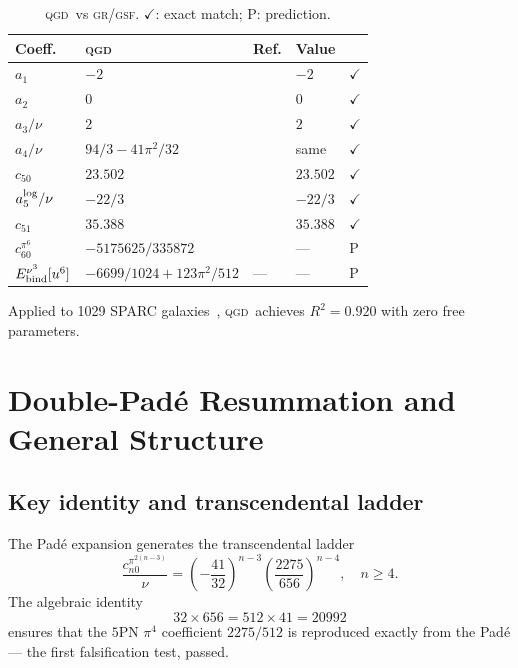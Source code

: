 \documentclass[twocolumn,aps,prd,showpacs,superscriptaddress,floatfix]{revtex4-2}
\newcommand{\pn}[1]{$#1$PN}
\newcommand{\QGD}{\textsc{qgd}}
\newcommand{\GR}{\textsc{gr}}
\newcommand{\GSF}{\textsc{gsf}}
\begin{document}
\begin{table}[ht]
\centering
\caption{\QGD\ vs \GR/\GSF. $\checkmark$: exact match; P: prediction.}
\label{tab:gr}
\begin{tabular}{lllll}
\toprule
Coeff.\ & \QGD & Ref. & Value & \\
\midrule
$a_1$ & $-2$ & \cite{Buonanno:1998gg} & $-2$ & $\checkmark$ \\
$a_2$ & $0$ & \cite{Buonanno:1998gg} & $0$ & $\checkmark$ \\
$a_3/\nu$ & $2$ & \cite{Damour:2001bu} & $2$ & $\checkmark$ \\
$a_4/\nu$ & $94/3-41\pi^2/32$ & \cite{Damour:2001bu} & same & $\checkmark$ \\
$c_{50}$ & $23.502$ & \cite{Bini:2013zaa} & $23.502$ & $\checkmark$ \\
$a_5^{\rm log}/\nu$ & $-22/3$ & \cite{Damour:2014jta} & $-22/3$ & $\checkmark$ \\
$c_{51}$ & $35.388$ & \cite{Bini:2020hmy} & $35.388$ & $\checkmark$ \\
$c_{60}^{\pi^6}$ & $-5175625/335872$ & \cite{Bini:2020wpo} & --- & P \\
$E_{\rm bind}^{\nu^3}[u^6]$ & $-6699/1024+123\pi^2/512$ & --- & --- & P \\
\bottomrule
\end{tabular}
\end{table}

Applied to 1029 SPARC galaxies~\cite{Lelli:2016zqa},
\QGD\ achieves $R^2=0.920$ with zero free parameters.

\section{Double-Pad\'e Resummation and General Structure}
\label{sec:resum}

\subsection{Key identity and transcendental ladder}

The Pad\'e expansion generates the transcendental ladder
\begin{equation}
  \frac{c_{n0}^{\pi^{2(n-3)}}}{\nu}
  = \left(-\frac{41}{32}\right)^{n-3}
    \!\left(\frac{2275}{656}\right)^{n-4},
  \quad n\ge4.
  \label{eq:ladder}
\end{equation}
The algebraic identity
\begin{equation}
  \boxed{32\times656 = 512\times41 = 20992}
  \label{eq:key}
\end{equation}
ensures that the \pn{5} $\pi^4$ coefficient $2275/512$ is reproduced
exactly from the Pad\'e — the first falsification test, passed.
\end{document}
